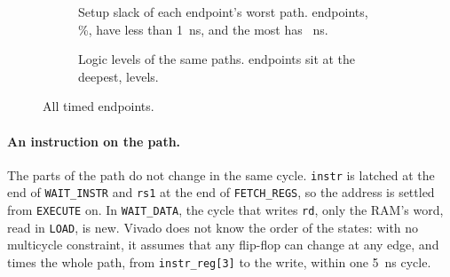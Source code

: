 \documentclass[11pt,a4paper]{report}
\begin{document}
\begin{figure}[!ht]
  \centering
  \begin{subfigure}[b]{0.49\textwidth}
    \caption{Setup slack of each endpoint's worst path. \implUnderOneNs{} endpoints,
      \implUnderOneNsPct\,\%, have less than 1~ns, and the most has \implSlackMax~ns.}
    \label{fig:slack}
  \end{subfigure}\hfill
  \begin{subfigure}[b]{0.49\textwidth}
    \caption{Logic levels of the same paths. \implDeepestCount{} endpoints sit at the
      deepest, \implDeepest{} levels.}
    \label{fig:levels}
  \end{subfigure}
  \caption{All \implEndpoints{} timed endpoints.}
  \label{fig:timing-margin}
\end{figure}

\paragraph{An instruction on the path.} The parts of the path do not change in the same
cycle. \texttt{instr} is latched at the end of \texttt{WAIT\_INSTR} and \texttt{rs1} at the
end of \texttt{FETCH\_REGS}, so the address is settled from \texttt{EXECUTE} on. In
\texttt{WAIT\_DATA}, the cycle that writes \texttt{rd}, only the RAM's word, read in
\texttt{LOAD}, is new. Vivado does not know the order of the states: with no multicycle
constraint, it assumes that any flip-flop can change at any edge, and times the whole path,
from \texttt{instr\_reg[3]} to the write, within one 5~ns cycle.
\end{document}
